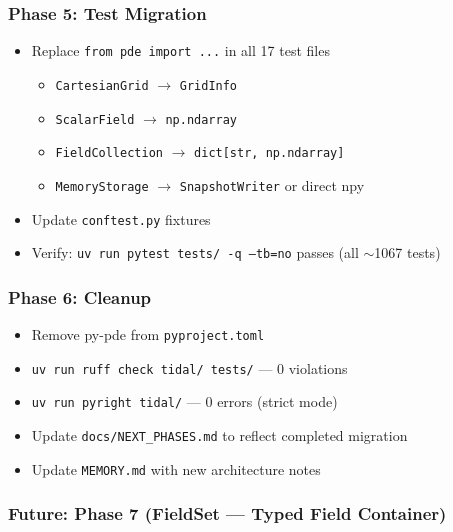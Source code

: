 \subsubsection{Phase 5: Test Migration}
\label{sec:phase5}

\begin{itemize}
  \item[$\square$] Replace \texttt{from pde import ...} in all 17 test files
  \begin{itemize}
    \item \texttt{CartesianGrid} $\to$ \texttt{GridInfo}
    \item \texttt{ScalarField} $\to$ \texttt{np.ndarray}
    \item \texttt{FieldCollection} $\to$ \texttt{dict[str, np.ndarray]}
    \item \texttt{MemoryStorage} $\to$ \texttt{SnapshotWriter} or direct npy
  \end{itemize}
  \item[$\square$] Update \texttt{conftest.py} fixtures
  \item[$\square$] Verify: \texttt{uv run pytest tests/ -q --tb=no} passes (all $\sim$1067 tests)
\end{itemize}

\subsubsection{Phase 6: Cleanup}
\label{sec:phase6}

\begin{itemize}
  \item[$\square$] Remove py-pde from \texttt{pyproject.toml}
  \item[$\square$] \texttt{uv run ruff check tidal/ tests/} --- 0 violations
  \item[$\square$] \texttt{uv run pyright tidal/} --- 0 errors (strict mode)
  \item[$\square$] Update \texttt{docs/NEXT\_PHASES.md} to reflect completed migration
  \item[$\square$] Update \texttt{MEMORY.md} with new architecture notes
\end{itemize}

\subsubsection{Future: Phase 7 (FieldSet --- Typed Field Container)}
\label{sec:phase7}

